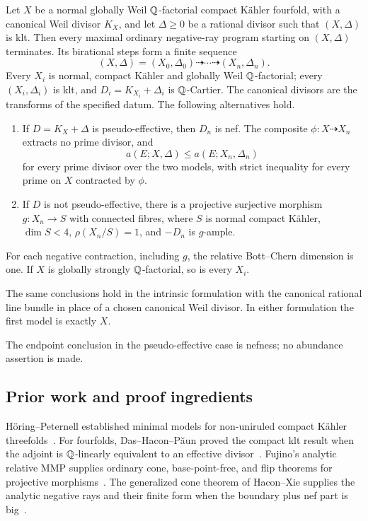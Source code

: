 \begin{theorem}\label{thm:finite}
Let $X$ be a normal globally Weil $\mathbb Q$-factorial compact Kähler
fourfold, with a canonical Weil divisor $K_X$, and let $\Delta\geq0$
be a rational divisor such that $(X,\Delta)$ is klt. Then every maximal
ordinary negative-ray program starting on $(X,\Delta)$ terminates.
Its birational steps form a finite sequence
\[
 (X,\Delta)=(X_0,\Delta_0)\dashrightarrow\cdots
 \dashrightarrow(X_n,\Delta_n).
\]
Every $X_i$ is normal, compact Kähler and globally Weil
$\mathbb Q$-factorial; every $(X_i,\Delta_i)$ is klt, and
$D_i=K_{X_i}+\Delta_i$ is $\mathbb Q$-Cartier. The canonical divisors are
the transforms of the specified datum. The following alternatives hold.
\begin{enumerate}[label=\textup{(\roman*)}]
\item If $D=K_X+\Delta$ is pseudo-effective, then $D_n$ is nef.
The composite $\phi:X\dashrightarrow X_n$ extracts no prime divisor,
and
\[
 a(E;X,\Delta)\leq a(E;X_n,\Delta_n)
\]
for every prime divisor over the two models, with strict inequality
for every prime on $X$ contracted by $\phi$.
\item If $D$ is not pseudo-effective, there is a projective surjective
morphism $g:X_n\to S$ with connected fibres, where $S$ is normal
compact Kähler, $\dim S<4$, $\rho(X_n/S)=1$, and $-D_n$ is
$g$-ample.
\end{enumerate}
For each negative contraction, including $g$, the relative
Bott--Chern dimension is one. If $X$ is globally strongly
$\mathbb Q$-factorial, so is every $X_i$.

The same conclusions hold in the intrinsic formulation with the
canonical rational line bundle in place of a chosen canonical Weil
divisor. In either formulation the first model is exactly $X$.
\end{theorem}

The endpoint conclusion in the pseudo-effective case is nefness; no
abundance assertion is made.

\subsection{Prior work and proof ingredients}

Höring--Peternell established minimal models for non-uniruled compact
Kähler threefolds~\cite{HP2016}. For fourfolds,
Das--Hacon--Păun proved the compact klt result when the adjoint is
$\mathbb Q$-linearly equivalent to an effective divisor~\cite{DHP2024}.
Fujino's analytic relative MMP supplies ordinary cone, base-point-free,
and flip theorems for projective morphisms~\cite{Fujino2022}.
The generalized cone theorem of Hacon--Xie supplies the analytic
negative rays and their finite form when the boundary plus nef part is
big~\cite[Theorem~1.3]{HX2026}.

